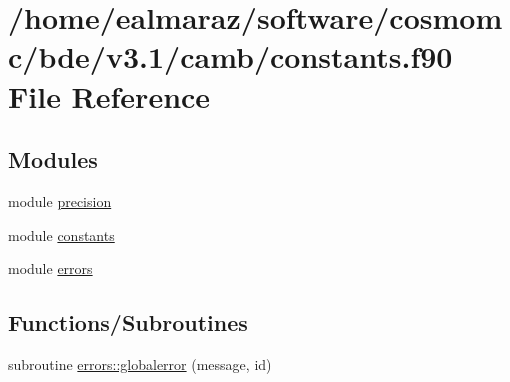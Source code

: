 \hypertarget{constants_8f90}{}\section{/home/ealmaraz/software/cosmomc/bde/v3.1/camb/constants.f90 File Reference}
\label{constants_8f90}
\subsection*{Modules}
\begin{DoxyCompactItemize}
\item 
module \mbox{\hyperlink{namespaceprecision}{precision}}
\item 
module \mbox{\hyperlink{namespaceconstants}{constants}}
\item 
module \mbox{\hyperlink{namespaceerrors}{errors}}
\end{DoxyCompactItemize}
\subsection*{Functions/\+Subroutines}
\begin{DoxyCompactItemize}
\item 
subroutine \mbox{\hyperlink{namespaceerrors_a318b5ebaf7fbc154515be2da7e932943}{errors\+::globalerror}} (message, id)
\end{DoxyCompactItemize}
